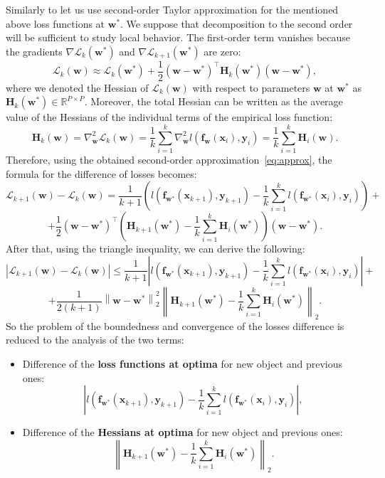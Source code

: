 \documentclass{article}
\begin{document}
Similarly to \cite{kiselev2024unraveling} let us use second-order Taylor approximation for the mentioned above loss functions at \(\mathbf{w}^*\). We suppose that decomposition to the second order will be sufficient to study local behavior. The first-order term vanishes because the gradients \(\nabla \mathcal{L}_{k}(\mathbf{w}^*)\) and \(\nabla \mathcal{L}_{k+1}(\mathbf{w}^*)\) are zero:
\begin{equation}\label{eq:approx}
    \mathcal{L}_{k}(\mathbf{w}) \approx \mathcal{L}_{k}(\mathbf{w}^*) + \dfrac{1}{2} (\mathbf{w} - \mathbf{w}^*)^\top \mathbf{H}_k(\mathbf{w}^*) (\mathbf{w} - \mathbf{w}^*),
\end{equation}
where we denoted the Hessian of \(\mathcal{L}_{k}(\mathbf{w})\) with respect to parameters \(\mathbf{w}\) at \(\mathbf{w}^*\) as \(\mathbf{H}_k(\mathbf{w}^*) \in \mathbb{R}^{P \times P}\). Moreover, the total Hessian can be written as the average value of the Hessians of the individual terms of the empirical loss function:
\[ \mathbf{H}_k(\mathbf{w}) = \nabla^2_{\mathbf{w}} \mathcal{L}_{k}(\mathbf{w}) = \dfrac{1}{k} \sum_{i=1}^{k} \nabla^2_{\mathbf{w}} l(\mathbf{f}_{\mathbf{w}}(\mathbf{x}_{i}), \mathbf{y}_{i}) = \dfrac{1}{k} \sum_{i=1}^{k} \mathbf{H}_i(\mathbf{w}). \]
Therefore, using the obtained second-order approximation~\eqref{eq:approx}, the formula for the difference of losses becomes:
\[ \mathcal{L}_{k+1}(\mathbf{w}) - \mathcal{L}_k(\mathbf{w}) = \dfrac{1}{k+1} \left( l(\mathbf{f}_{\mathbf{w}^*}(\mathbf{x}_{k+1}), \mathbf{y}_{k+1}) - \dfrac{1}{k} \sum_{i=1}^{k} l(\mathbf{f}_{\mathbf{w}^*}(\mathbf{x}_{i}), \mathbf{y}_{i}) \right) + \]
\[ + \dfrac{1}{2} (\mathbf{w} - \mathbf{w}^*)^\top \left( \mathbf{H}_{k+1}(\mathbf{w}^*) - \dfrac{1}{k} \sum_{i=1}^{k} \mathbf{H}_i(\mathbf{w}^*) \right) (\mathbf{w} - \mathbf{w}^*). \]
After that, using the triangle inequality, we can derive the following:
\[ \left| \mathcal{L}_{k+1}(\mathbf{w}) - \mathcal{L}_k(\mathbf{w}) \right| \leqslant \dfrac{1}{k+1} \left| l(\mathbf{f}_{\mathbf{w}^*}(\mathbf{x}_{k+1}), \mathbf{y}_{k+1}) - \dfrac{1}{k} \sum_{i=1}^{k} l(\mathbf{f}_{\mathbf{w}^*}(\mathbf{x}_{i}), \mathbf{y}_{i}) \right| + \]
\[ + \dfrac{1}{2 (k+1)} \left\| \mathbf{w} - \mathbf{w}^* \right\|_2^2 \left\| \mathbf{H}_{k+1}(\mathbf{w}^*) - \dfrac{1}{k} \sum_{i=1}^{k} \mathbf{H}_i(\mathbf{w}^*) \right\|_2. \]
So the problem of the boundedness and convergence of the losses difference is reduced to the analysis of the two terms:
\begin{itemize}
    \item Difference of the \textbf{loss functions at optima} for new object and previous ones:
    \[ \left| l(\mathbf{f}_{\mathbf{w}^*}(\mathbf{x}_{k+1}), \mathbf{y}_{k+1}) - \dfrac{1}{k} \sum_{i=1}^{k} l(\mathbf{f}_{\mathbf{w}^*}(\mathbf{x}_{i}), \mathbf{y}_{i}) \right|, \]
    \item Difference of the \textbf{Hessians at optima} for new object and previous ones:
    \[ \left\| \mathbf{H}_{k+1}(\mathbf{w}^*) - \dfrac{1}{k} \sum_{i=1}^{k} \mathbf{H}_i(\mathbf{w}^*) \right\|_2. \]
\end{itemize}
\end{document}
